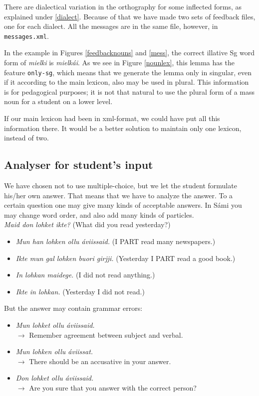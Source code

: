 \documentclass[a4paper,12pt]{article}
\begin{document}
There are dialectical variation in the orthography for some inflected forms, as explained under \ref{dialect}. Because of that we have made two sets of feedback files, one for each dialect. All the messages are in the same file, however, in \texttt{messages.xml}.

In the example in Figures \ref{feedbacknouns} and \ref{mess}, the correct illative Sg word form of \textit{mielki} is \textit{mielkái}. As we see in Figure \ref{nounlex}, this lemma has the feature \texttt{only-sg}, which means that we generate the lemma only in singular, even if it according to the main lexicon, also may be used in plural. This information is for pedagogical purposes; it is not that natural to use the plural form of a mass noun for a student on a lower level.

If our main lexicon had been in xml-format, we could have put all this information there. It would be a better solution to maintain only one lexicon, instead of two.


\subsection{Analyser for student's input}\label{sentencefeedback}
We have chosen not to use multiple-choice, but we let the student formulate his/her own answer. That means that we have to analyze the answer. To a certain question one may give many kinds of acceptable answers. In Sámi you may change word order, and also add many kinds of particles. \\

\textit{Maid don lohket ikte?} (What did you read yesterday?)
\begin{itemize}
\item \textit{Mun han lohken ollu áviissaid.} (I PART read many newspapers.)
\item \textit{Ikte mun gal lohken buori girjji.} (Yesterday I PART read a good book.)
\item \textit{In lohkan maidege.} (I did not read anything.)
\item \textit{Ikte in lohkan.} (Yesterday I did not read.)
\end{itemize}


But the answer may contain grammar errors:

\begin{itemize}
\item \textit{Mun lohket ollu áviissaid.} \\ $\rightarrow$ Remember agreement between subject and verbal.  
\item \textit{Mun lohken ollu áviissat.} \\ $\rightarrow$ There should be an accusative in your answer. 
\item \textit{Don lohket ollu áviissaid.} \\ $\rightarrow$ Are you sure that you answer with the correct person?  
\end{itemize}
\end{document}
